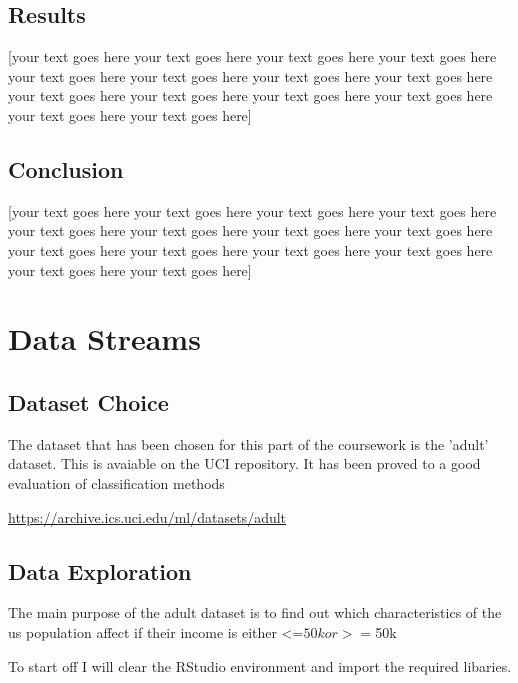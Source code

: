 \documentclass[10pt  ,usenames, dvipsnames]{article}\usepackage[]{graphicx}\usepackage[]{color}
\begin{document}
\subsection{Results}
[your text goes here your text goes here your text goes here your text goes here your text goes here your text goes here your text goes here your text goes here your text goes here your text goes here your text goes here your text goes here your text goes here your text goes here]
\subsection{Conclusion}

[your text goes here your text goes here your text goes here your text goes here your text goes here your text goes here your text goes here your text goes here your text goes here your text goes here your text goes here your text goes here your text goes here your text goes here]




\section {Data Streams}

\subsection{Dataset Choice}

The dataset that has been chosen for this part of the coursework is the 'adult' dataset. This is avaiable on the UCI repository. It has been proved to a good evaluation of classification methods

\url{https://archive.ics.uci.edu/ml/datasets/adult}



\subsection{Data Exploration}

The main purpose of the adult dataset is to find out which characteristics of the us population affect if their income is either <=$50k or >=$50k



To start off I will clear the RStudio environment and import the required libaries.
\end{document}
